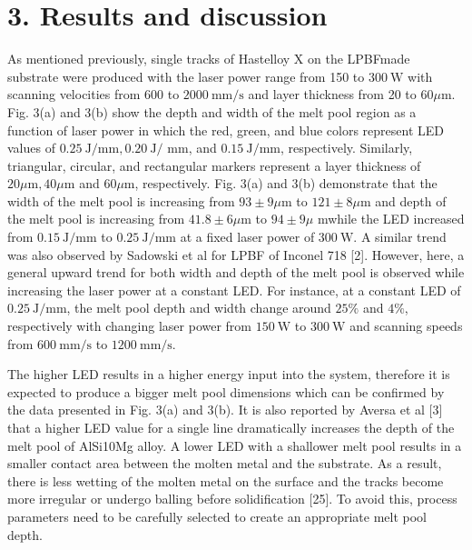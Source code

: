 \documentclass[10pt]{article}
\begin{document}
\section*{3. Results and discussion}
As mentioned previously, single tracks of Hastelloy $\mathrm{X}$ on the LPBFmade substrate were produced with the laser power range from 150 to $300 \mathrm{~W}$ with scanning velocities from 600 to $2000 \mathrm{~mm} / \mathrm{s}$ and layer thickness from 20 to $60 \mu \mathrm{m}$. Fig. 3(a) and 3(b) show the depth and width of the melt pool region as a function of laser power in which the red, green, and blue colors represent LED values of $0.25 \mathrm{~J} / \mathrm{mm}, 0.20 \mathrm{~J} /$ $\mathrm{mm}$, and $0.15 \mathrm{~J} / \mathrm{mm}$, respectively. Similarly, triangular, circular, and rectangular markers represent a layer thickness of $20 \mu \mathrm{m}, 40 \mu \mathrm{m}$ and $60 \mu \mathrm{m}$, respectively. Fig. 3(a) and 3(b) demonstrate that the width of the melt pool is increasing from $93 \pm 9 \mu \mathrm{m}$ to $121 \pm 8 \mu \mathrm{m}$ and depth of the melt pool is increasing from $41.8 \pm 6 \mu \mathrm{m}$ to $94 \pm 9 \mu$ mwhile the LED increased from $0.15 \mathrm{~J} / \mathrm{mm}$ to $0.25 \mathrm{~J} / \mathrm{mm}$ at a fixed laser power of $300 \mathrm{~W}$. A similar trend was also observed by Sadowski et al for LPBF of Inconel 718 [2]. However, here, a general upward trend for both width and depth of the melt pool is observed while increasing the laser power at a constant LED. For instance, at a constant LED of $0.25 \mathrm{~J} / \mathrm{mm}$, the melt pool depth and width change around $25 \%$ and $4 \%$, respectively with changing laser power from $150 \mathrm{~W}$ to $300 \mathrm{~W}$ and scanning speeds from $600 \mathrm{~mm} / \mathrm{s}$ to $1200 \mathrm{~mm} / \mathrm{s}$.

The higher LED results in a higher energy input into the system, therefore it is expected to produce a bigger melt pool dimensions which can be confirmed by the data presented in Fig. 3(a) and 3(b). It is also reported by Aversa et al [3] that a higher LED value for a single line dramatically increases the depth of the melt pool of AlSi10Mg alloy. A lower LED with a shallower melt pool results in a smaller contact area between the molten metal and the substrate. As a result, there is less wetting of the molten metal on the surface and the tracks become more irregular or undergo balling before solidification [25]. To avoid this, process parameters need to be carefully selected to create an appropriate melt pool depth.
\end{document}
